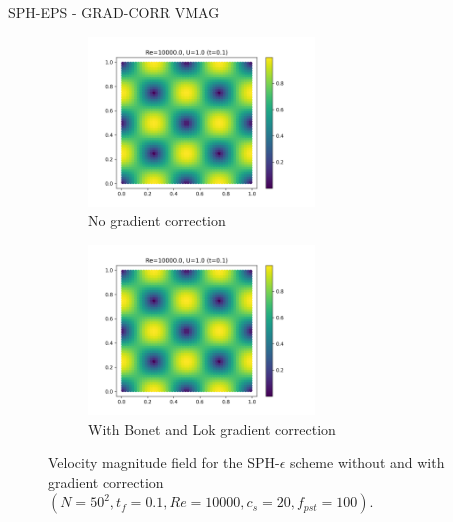 SPH-EPS - GRAD-CORR VMAG 
\begin{figure}[H]
  \begin{subfigure}{7cm}
  \centering\includegraphics[width=6cm]{Code-Figures/mon2017/grad_corr/c0_20_tait_pec_dtmul_1_mkc_no_nx_50_pst_10_re_10000_mon2017/final_vmag.png}
  \caption{No gradient correction}
  \end{subfigure}
  \begin{subfigure}{7cm}
  \centering\includegraphics[width=6cm]{Code-Figures/mon2017/grad_corr/c0_20_tait_pec_dtmul_1_mkc_yes_nx_50_pst_10_re_10000_mon2017/final_vmag.png}
  \caption{With Bonet and Lok gradient correction}
  \end{subfigure}
  \caption{Velocity magnitude field for the SPH-$\epsilon$ scheme without and with gradient correction $(N=50^2, t_f=0.1, Re=10000, c_s=20, f_{pst}=100)$.}
  \label{fig:sph-eps-grad-corr-vmag}
\end{figure}

